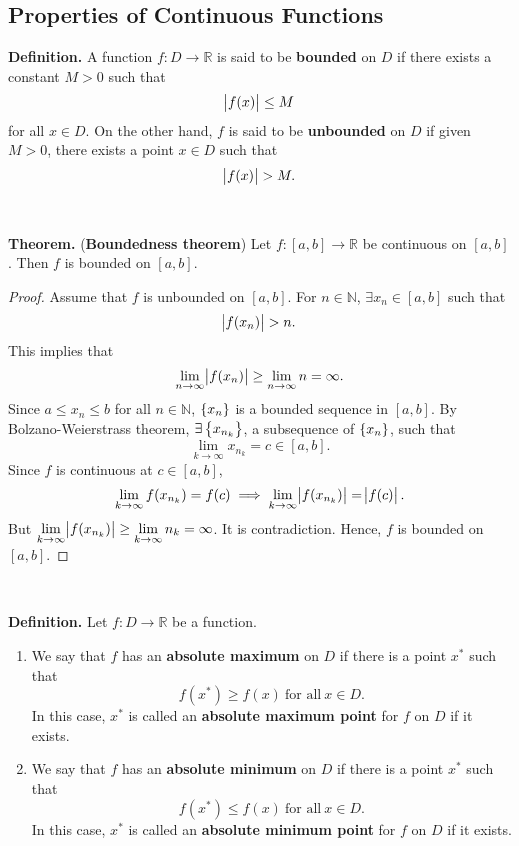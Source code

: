 \documentclass[12pt,a4paper]{article}
\begin{document}
\subsection{Properties of Continuous Functions}
\begin{tcolorbox}[colback=white]
	\textbf{Definition.} A function $f:D\to\mathbb{R}$ is said to be \textbf{bounded} on $D$ if there exists a constant $M>0$ such that \[
	\abs{f(x)}\leq M
	\] for all $x\in D$. On the other hand, $f$ is said to be \textbf{unbounded} on $D$ if given $M>0$, there exists a point $x\in D$ such that \[
	\abs{f(x)}>M.
	\]
\end{tcolorbox}
\
\begin{tcolorbox}[colback=white]
	\textbf{Theorem.} (\textbf{Boundedness theorem}) Let $f:[a,b]\to\mathbb{R}$ be continuous on $[a,b]$. Then $f$ is bounded on $[a,b]$.\tcblower\begin{proof}
		Assume that $f$ is unbounded on $[a,b]$. For $n\in\mathbb{N}$, $\exists x_n\in[a,b]$ such that \[
		\abs{f(x_n)}>n.
		\] This implies that \[
		\lim\limits_{n\to\infty}\abs{f(x_n)}\geq\lim\limits_{n\to\infty}n=\infty.
		\] Since $a\leq x_n\leq b$ for all $n\in\mathbb{N}$, $\set{x_n}$ is a bounded sequence in $[a,b]$. By Bolzano-Weierstrass theorem, $\exists \set{x_{n_k}}$, a subsequence of $\set{x_n}$, such that \[
		\lim\limits_{k\to\infty}x_{n_k}=c\in[a,b].
		\] Since $f$ is continuous at $c\in[a,b]$, \[
		\lim\limits_{k\to\infty}f(x_{n_k})=f(c)\implies \lim\limits_{k\to\infty}\abs{f(x_{n_k})}=\abs{f(c)}.
		\] But $\lim\limits_{k\to\infty}\abs{f(x_{n_k})}\geq\lim\limits_{k\to\infty}n_k=\infty$. It is contradiction. Hence, $f$ is bounded on $[a,b]$.
	\end{proof}
\end{tcolorbox}
\
\begin{tcolorbox}[colback=white]
	\textbf{Definition.} Let $f:D\to\mathbb{R}$ be a function. \begin{enumerate}
		\item We say that $f$ has an \textbf{absolute maximum} on $D$ if there is a point $x^*$ such that \[
		f(x^*)\geq f(x)\ \text{for all}\ x\in D.
		\] In this case, $x^*$ is called an \textbf{absolute maximum point} for $f$ on $D$ if it exists.
		\item We say that $f$ has an \textbf{absolute minimum} on $D$ if there is a point $x^*$ such that \[
		f(x^*)\leq f(x)\ \text{for all}\ x\in D.
		\] In this case, $x^*$ is called an \textbf{absolute minimum point} for $f$ on $D$ if it exists.
	\end{enumerate}
\end{tcolorbox}
\end{document}
